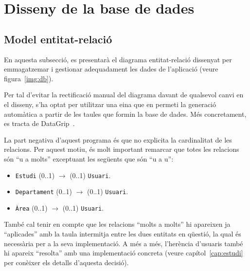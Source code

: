 \documentclass[a4paper,12pt]{ThesisStyle}
\begin{document}
\section{Disseny de la base de dades}
\label{sec:disseny_bdd}

\subsection{Model entitat-relació}
\label{subsec:bd_model_er}

En aquesta subsecció, es presentarà el diagrama entitat-relació dissenyat per emmagatzemar i gestionar adequadament les dades de l'aplicació (veure figura~\ref{img:db}).

Per tal d'evitar la rectificació manual del diagrama davant de qualsevol canvi en el disseny, s'ha optat per utilitzar una eina que en permeti la generació automàtica a partir de les taules que formin la base de dades. Més concretament, es tracta de DataGrip~\cite{JetBrains}.

La part negativa d'aquest programa és que no explicita la cardinalitat de les relacions. Per aquest motiu, és molt important remarcar que totes les relacions són ``u a molts'' exceptuant les següents que són ``u a u'':
\begin{itemize}
  \item \texttt{Estudi} (0..1) $\longrightarrow$ (0..1) \texttt{Usuari}.
  \item \texttt{Departament} (0..1) $\longrightarrow$ (0..1) \texttt{Usuari}.
  \item \texttt{Àrea} (0..1) $\longrightarrow$ (0..1) \texttt{Usuari}.
\end{itemize}

També cal tenir en compte que les relacions ``molts a molts'' hi apareixen ja ``aplicades'' amb la taula intermitja entre les dues entitats en qüestió, la qual és necessària per a la seva implementació. A més a més, l'herència d'usuaris també hi apareix ``resolta'' amb una implementació concreta (veure capítol~\ref{cap:estudi} per conèixer els detalls d'aquesta decisió).
\end{document}

